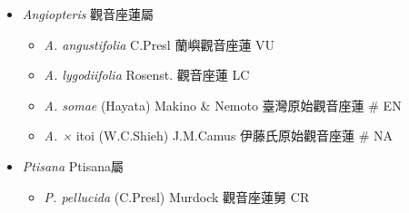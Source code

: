 
  \begin{itemize}
 \item[] \textit{Angiopteris} 觀音座蓮屬
                                
  \begin{itemize}
        \item[] \textit{A. angustifolia} C.Presl  蘭嶼觀音座蓮   VU
        \item[] \textit{A. lygodiifolia} Rosenst.  觀音座蓮   LC
        \item[] \textit{A. somae} (Hayata) Makino \& Nemoto  臺灣原始觀音座蓮  \# EN
        \item[] \textit{A. ×} itoi \textit{} (W.C.Shieh) J.M.Camus 
                                        伊藤氏原始觀音座蓮  \# NA
  \end{itemize}
 \item[] \textit{Ptisana} Ptisana屬
                                
  \begin{itemize}
        \item[] \textit{P. pellucida} (C.Presl) Murdock  觀音座蓮舅   CR
  \end{itemize}
  \end{itemize}
